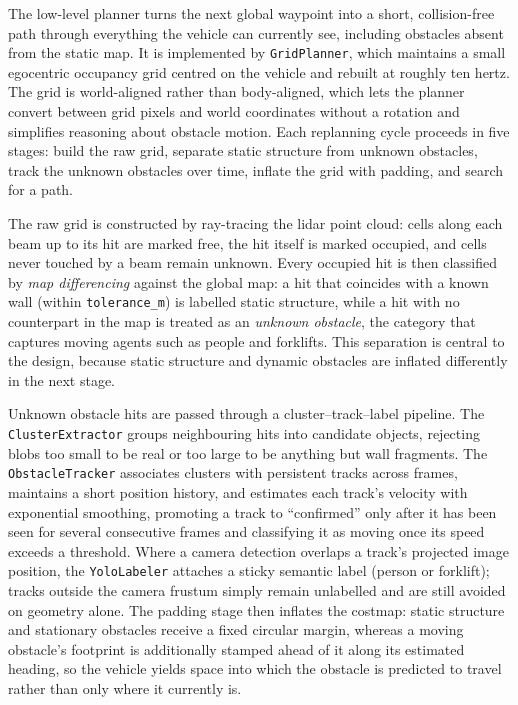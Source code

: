 The low-level planner turns the next global waypoint into a short, collision-free path through everything the vehicle can currently see, including obstacles absent from the static map. It is implemented by \texttt{GridPlanner}, which maintains a small egocentric occupancy grid centred on the vehicle and rebuilt at roughly ten hertz. The grid is world-aligned rather than body-aligned, which lets the planner convert between grid pixels and world coordinates without a rotation and simplifies reasoning about obstacle motion. Each replanning cycle proceeds in five stages: build the raw grid, separate static structure from unknown obstacles, track the unknown obstacles over time, inflate the grid with padding, and search for a path.

The raw grid is constructed by ray-tracing the lidar point cloud: cells along each beam up to its hit are marked free, the hit itself is marked occupied, and cells never touched by a beam remain unknown. Every occupied hit is then classified by \emph{map differencing} against the global map: a hit that coincides with a known wall (within \texttt{tolerance\_m}) is labelled static structure, while a hit with no counterpart in the map is treated as an \emph{unknown obstacle}, the category that captures moving agents such as people and forklifts. This separation is central to the design, because static structure and dynamic obstacles are inflated differently in the next stage.

Unknown obstacle hits are passed through a cluster--track--label pipeline. The \texttt{ClusterExtractor} groups neighbouring hits into candidate objects, rejecting blobs too small to be real or too large to be anything but wall fragments. The \texttt{ObstacleTracker} associates clusters with persistent tracks across frames, maintains a short position history, and estimates each track's velocity with exponential smoothing, promoting a track to ``confirmed'' only after it has been seen for several consecutive frames and classifying it as moving once its speed exceeds a threshold. Where a camera detection overlaps a track's projected image position, the \texttt{YoloLabeler} attaches a sticky semantic label (person or forklift); tracks outside the camera frustum simply remain unlabelled and are still avoided on geometry alone. The padding stage then inflates the costmap: static structure and stationary obstacles receive a fixed circular margin, whereas a moving obstacle's footprint is additionally stamped ahead of it along its estimated heading, so the vehicle yields space into which the obstacle is predicted to travel rather than only where it currently is.

